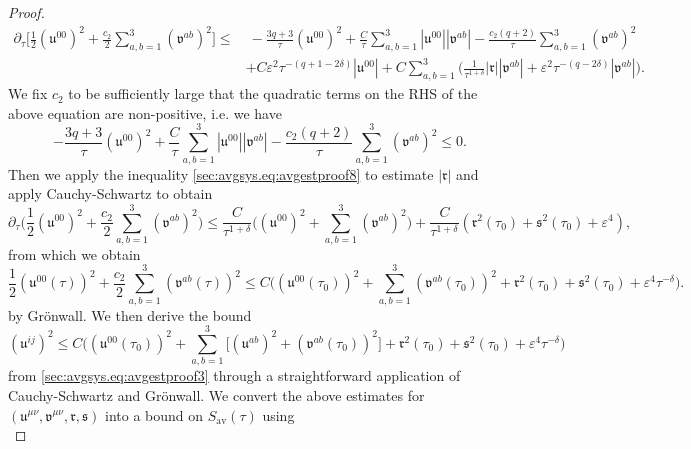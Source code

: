 \documentclass[10pt,a4paper]{amsart}
\newcommand{\av}{\mathrm{av}}
\newcommand{\mf}{\mathfrak}
\newcommand{\pa}{\partial}
\newcommand{\ve}{\varepsilon}
\begin{document}
\begin{proof}
    \begin{align}
        \pa_\tau\Big[\frac{1}{2}(\mf{u}^{00})^2 + \frac{c_2}{2} \sum_{a,b=1}^3(\mf{v}^{ab})^2\Big] \leq &\> -\frac{3q+3}{\tau}(\mf{u}^{00})^2 + \frac{C}{\tau}\sum_{a,b=1}^3 |\mf{u}^{00}||\mf{v}^{ab}| - \frac{c_2(q+2)}{\tau}\sum_{a,b=1}^3(\mf{v}^{ab})^2\nonumber\\
        &+ C\ve^2\tau^{-(q+1-2\delta)}|\mf{u}^{00}| + C\sum_{a,b=1}^3\Big(\frac{1}{\tau^{1+\delta}}|\mf{r}||\mf{v}^{ab}| + \ve^2\tau^{-(q-2\delta)}|\mf{v}^{ab}|\Big).
    \end{align}
    We fix $c_2$ to be sufficiently large that the quadratic terms on the RHS of the above equation are non-positive, i.e. we have
    \begin{equation}
        -\frac{3q+3}{\tau}(\mf{u}^{00})^2 + \frac{C}{\tau}\sum_{a,b=1}^3 |\mf{u}^{00}||\mf{v}^{ab}| - \frac{c_2(q+2)}{\tau}\sum_{a,b=1}^3(\mf{v}^{ab})^2 \leq 0.
    \end{equation}
    Then we apply the inequality \eqref{sec:avgsys.eq:avgestproof8} to estimate $|\mf{r}|$ and apply Cauchy-Schwartz to obtain
    \begin{equation}
        \pa_\tau\Big(\frac{1}{2}(\mf{u}^{00})^2 + \frac{c_2}{2} \sum_{a,b=1}^3(\mf{v}^{ab})^2\Big) \leq \frac{C}{\tau^{1+\delta}}\Big((\mf{u}^{00})^2+\sum_{a,b=1}^3(\mf{v}^{ab})^2\Big) + \frac{C}{\tau^{1+\delta}}(\mf{r}^2(\tau_0)+\mf{s}^2(\tau_0)+\ve^4),
    \end{equation}
    from which we obtain
    \begin{equation}\label{sec:avgsys.eq:avgestproof9}
        \frac{1}{2}(\mf{u}^{00}(\tau))^2 + \frac{c_2}{2} \sum_{a,b=1}^3(\mf{v}^{ab}(\tau))^2 \leq C\Big((\mf{u}^{00}(\tau_0))^2 + \sum_{a,b=1}^3(\mf{v}^{ab}(\tau_0))^2 + \mf{r}^2(\tau_0) +\mf{s}^2(\tau_0) + \ve^4\tau^{-\delta}\Big).
    \end{equation}
    by Gr\"onwall. We then derive the bound
    \begin{equation}\label{sec:avgsys.eq:avgestproof10}
        (\mf{u}^{ij})^2 \leq C\Big((\mf{u}^{00}(\tau_0))^2 + \sum_{a,b=1}^3\big[(\mf{u}^{ab})^2+(\mf{v}^{ab}(\tau_0))^2\big] + \mf{r}^2(\tau_0) +\mf{s}^2(\tau_0) + \ve^4\tau^{-\delta}\Big)
    \end{equation}
    from \eqref{sec:avgsys.eq:avgestproof3} through a straightforward application of Cauchy-Schwartz and Gr\"onwall. We convert the above estimates for $(\mf{u}^{\mu\nu},\mf{v}^{\mu\nu},\mf{r},\mf{s})$ into a bound on $S_{\av}(\tau)$ using
    \begin{subequations}

\end{subequations}
\end{proof}
\end{document}

